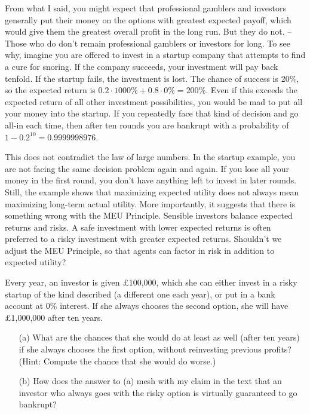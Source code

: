 
From what I said, you might expect that professional gamblers and investors
generally put their money on the options with greatest expected payoff, which
would give them the greatest overall profit in the long run. But they do not. --
Those who do don't remain professional gamblers or investors for long. To see
why, imagine you are offered to invest in a startup company that attempts to
find a cure for snoring. If the company succeeds, your investment will pay back
tenfold. If the startup fails, the investment is lost. The chance of success is
20\%, so the expected return is $0.2 \cdot 1000\% + 0.8 \cdot 0\% = 200\%$. Even
if this exceeds the expected return of all other investment possibilities, you
would be mad to put all your money into the startup. If you repeatedly face that
kind of decision and go all-in each time, then after ten rounds you are bankrupt
with a probability of $1-0.2^{10} = 0.9999998976$.%

This does not contradict the law of large numbers. In the startup
example, you are not facing the same decision problem again and
again. If you lose all your money in the first round, you don't have
anything left to invest in later rounds. Still, the example shows that
maximizing expected utility does not always mean maximizing long-term
actual utility. More importantly, it suggests that there is something
wrong with the MEU Principle. Sensible investors balance expected
returns and risks. A safe investment with lower expected returns is
often preferred to a risky investment with greater expected returns.
Shouldn't we adjust the MEU Principle, so that agents can factor in
risk in addition to expected utility?

\begin{exercise2}
  Every year, an investor is given £100,000, which she can either invest
  in a risky startup of the kind described (a different one
  each year), or put in a bank account at 0\% interest. If she always
  chooses the second option, she will have £1,000,000 after ten years.
  \begin{enumerate}
  \item[(a)] What are the chances that she would do at least as well
    (after ten years) if she always chooses the first option, without
    reinvesting previous profits? (Hint: Compute the chance that she
    would do worse.)
  \item[(b)] How does the answer to (a) mesh with my claim in the text
    that an investor who always goes with the risky option is
    virtually guaranteed to go bankrupt?
  \end{enumerate}
\end{exercise2}

